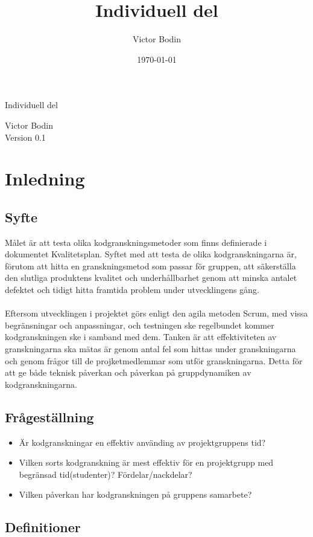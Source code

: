 \documentclass{article}
\title{Individuell del}
\author{Victor Bodin}
\date{\today}
\begin{document}
\thispagestyle{empty}

{
\sffamily
\centering
\large


{\huge 
Individuell del
}

{\large
Victor Bodin\\
Version 0.1
}
}

\clearpage

\renewcommand*\contentsname{Innehållsförteckning}
\tableofcontents
\clearpage

\clearpage
\section{Inledning}
\subsection{Syfte}
Målet är att testa olika kodgranskningsmetoder som finns definierade i dokumentet Kvalitetsplan. Syftet med att testa de olika kodgranskningarna är, förutom att hitta en granskningsmetod som passar för gruppen, att säkerställa den slutliga produktens kvalitet och underhållbarhet genom att minska antalet defektet och tidigt hitta framtida problem under utvecklingens gång.\\ \\
Eftersom utvecklingen i projektet görs enligt den agila metoden Scrum, med vissa begränsningar och anpassningar, och testningen ske regelbundet kommer kodgranskningen ske i samband med dem. Tanken är att effektiviteten av granskningarna ska mätas är genom antal fel som hittas under granskningarna och genom frågor till de projketmedlemmar som utför granskningarna. Detta för att ge både teknisk påverkan och påverkan på gruppdynamiken av kodgranskningarna.

\subsection{Frågeställning}
\begin{itemize}
\item Är kodgranskningar en effektiv använding av projektgruppens tid? 
\item Vilken sorts kodgranskning är mest effektiv för en projektgrupp med begränsad tid(studenter)? Fördelar/nackdelar?
\item Vilken påverkan har kodgranskningen på gruppens samarbete?
\end{itemize}

\subsection{Definitioner}
\end{document}
